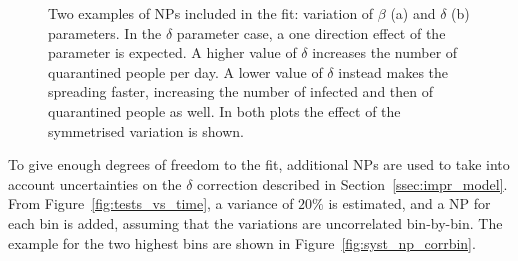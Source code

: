 \begin{figure}
\centering
{}
  \caption{Two examples of NPs included in the fit: variation of $\beta$ (a) and $\delta$ (b) parameters. In the $\delta$ parameter case, a one direction effect of the parameter is expected. A higher value of $\delta$ increases the number of quarantined people per day.  A lower value of $\delta$ instead makes the spreading faster, increasing the number of infected and then of quarantined people as well. In both plots the effect of the symmetrised variation is shown.}
  \label{fig:syst_np}
\end{figure}

To give enough degrees of freedom to the fit, additional NPs are used to take into account uncertainties on the $\delta$ correction described in Section~\ref{ssec:impr_model}. From Figure~\ref{fig:tests_vs_time}, a variance of $20\%$ is estimated, and a NP for each bin is added, assuming that the variations are uncorrelated bin-by-bin. The example for the two highest bins are shown in Figure~\ref{fig:syst_np_corrbin}.\\

